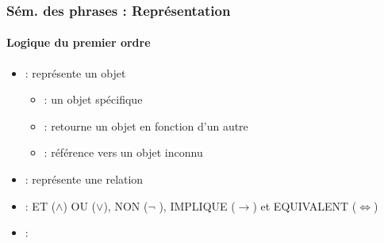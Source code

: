 \documentclass[xcolor=table]{beamer}
\begin{document}
\begin{frame}
	\frametitle{Sém. des phrases : Représentation}
	\framesubtitle{Logique du premier ordre}
	
	\begin{itemize}
		\item {} : représente un objet
		\begin{itemize}
			\item {} : un objet spécifique
			
			
			\item {} : retourne un objet en fonction d'un autre
			
			
			\item {} : référence vers un objet inconnu 
			
			
		\end{itemize}
		\item {} : représente une relation 
		
		
		\item {} : ET ($ \wedge $) OU ($ \vee $), NON ($ \neg $ ), IMPLIQUE ($\rightarrow$) et EQUIVALENT ($ \Leftrightarrow $)
		
		
		\item {} : 
		
		
	\end{itemize}
	
\end{frame}
\end{document}
